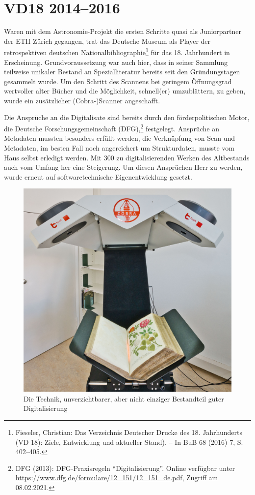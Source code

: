 \documentclass[a4paper,
fontsize=11pt,
oneside,
numbers=noperiodatend,
parskip=half-,
bibliography=totoc,
final
]{scrartcl}
\begin{document}
\hypertarget{vd18-20142016}{%
\section{VD18 2014--2016}\label{vd18-20142016}}

Waren mit dem Astronomie-Projekt die ersten Schritte quasi als
Juniorpartner der ETH Zürich gegangen, trat das Deutsche Museum als
Player der retrospektiven deutschen Nationalbibliographie\footnote{Fieseler,
  Christian: Das Verzeichnis Deutscher Drucke des 18. Jahrhunderts (VD
  18): Ziele, Entwicklung und aktueller Stand). -- In BuB 68 (2016) 7,
  S. 402--405.} für das 18. Jahrhundert in Erscheinung.
Grundvoraussetzung war auch hier, dass in seiner Sammlung teilweise
unikaler Bestand an Spezialliteratur bereits seit den Gründungstagen
gesammelt wurde. Um den Schritt des Scannens bei geringem Öffnungsgrad
wertvoller alter Bücher und die Möglichkeit, schnell(er) umzublättern,
zu geben, wurde ein zusätzlicher (Cobra-)Scanner angeschafft.

Die Ansprüche an die Digitalisate sind bereits durch den
förderpolitischen Motor, die Deutsche Forschungsgemeinschaft
(DFG),\footnote{DFG (2013): DFG-Praxisregeln \enquote{Digitalisierung}.
  Online verfügbar unter
  \url{https://www.dfg.de/formulare/12\_151/12\_151\_de.pdf}, Zugriff am
  08.02.2021.} festgelegt. Ansprüche an Metadaten mussten besonders
erfüllt werden, die Verknüpfung von Scan und Metadaten, im besten Fall
noch angereichert um Strukturdaten, musste vom Haus selbst erledigt
werden. Mit 300 zu digitalisierenden Werken des Altbestands auch vom
Umfang her eine Steigerung. Um diesen Ansprüchen Herr zu werden, wurde
erneut auf softwaretechnische Eigenentwicklung gesetzt.

\begin{figure}
\centering
\includegraphics[width=.6\textwidth]{img/Abb5.jpg}
\caption{Die Technik, unverzichtbarer, aber nicht einziger Bestandteil
guter Digitalisierung}
\end{figure}
\end{document}
